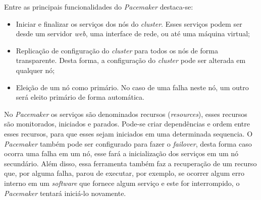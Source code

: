 Entre as principais funcionalidades do \textit{Pacemaker} destaca-se:
\begin{itemize}
 \item Iniciar e finalizar os serviços dos nós do \textit{cluster}. Esses serviços podem ser desde um servidor \textit{web}, uma interface de 
 rede, ou até uma máquina virtual;
 \item Replicação de configuração do \textit{cluster} para todos os nós de forma transparente. Desta forma, a configuração do \textit{cluster} 
 pode ser alterada em qualquer nó;
 \item Eleição de um nó como primário. No caso de uma falha neste nó, um outro será eleito primário de forma automática.
\end{itemize}

No \textit{Pacemaker} os serviços são denominados recursos (\textit{resources}), esses recursos são monitorados, iniciados e parados.
Pode-se criar dependências e ordem entre esses recursos, para que esses sejam iniciados em uma determinada sequencia. O \textit{Pacemaker} 
também pode ser configurado para fazer o \textit{failover}, desta forma caso ocorra uma falha em um nó, esse fará a inicialização dos serviços 
em um nó secundário. Além disso, essa ferramenta também faz a recuperação de um recurso que, por alguma falha, parou de executar, por exemplo, 
se ocorrer algum erro interno em um \textit{software} que fornece algum serviço e este for interrompido, o \textit{Pacemaker} tentará iniciá-lo
novamente.


